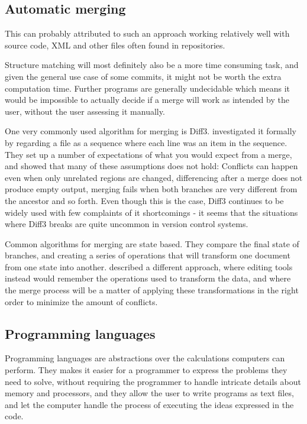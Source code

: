 \documentclass[11pt]{article}
\begin{document}
\subsection{Automatic merging}
This can probably attributed to such an approach working relatively well with source code, XML and other files often found in repositories.

Structure matching will most definitely also be a more time consuming task, and given the general use case of some commits, it might not be worth the extra computation time. Further programs are generally undecidable which means it would be impossible to actually decide if a merge will work as intended by the user, without the user assessing it manually.

One very commonly used algorithm for merging is Diff3. \citet{Khanna} investigated it formally by regarding a file as a sequence where each line was an item in the sequence. They set up a number of expectations of what you would expect from a merge, and showed that many of these assumptions does not hold: Conflicts can happen even when only unrelated regions are changed, differencing after a merge does not produce empty output, merging fails when both branches are very different from the ancestor and so forth. Even though this is the case, Diff3 continues to be widely used with few complaints of it shortcomings - it seems that the situations where Diff3 breaks are quite uncommon in version control systems.

Common algorithms for merging are state based. They compare the final state of branches, and creating a series of operations that will transform one document from one state into another. \citet{Lippe} described a different approach, where editing tools instead would remember the operations used to transform the data, and where the merge process will be a matter of applying these transformations in the right order to minimize the amount of conflicts.


\subsection{Programming languages}
Programming languages are abstractions over the calculations computers can perform. They makes it easier for a programmer to express the problems they need to solve, without requiring the programmer to handle intricate details about memory and processors, and they allow the user to write programs as text files, and let the computer handle the process of executing the ideas expressed in the code.
\end{document}
